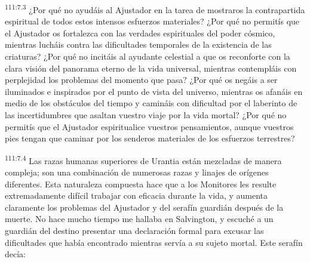\par
\textsuperscript{111:7.3} ¿Por qué no ayudáis al Ajustador en la tarea de mostraros la contrapartida espiritual de todos estos intensos esfuerzos materiales? ¿Por qué no permitís que el Ajustador os fortalezca con las verdades espirituales del poder cósmico, mientras lucháis contra las dificultades temporales de la existencia de las criaturas? ¿Por qué no incitáis al ayudante celestial a que os reconforte con la clara visión del panorama eterno de la vida universal, mientras contempláis con perplejidad los problemas del momento que pasa? ¿Por qué os negáis a ser iluminados e inspirados por el punto de vista del universo, mientras os afanáis en medio de los obstáculos del tiempo y camináis con dificultad por el laberinto de las incertidumbres que asaltan vuestro viaje por la vida mortal? ¿Por qué no permitís que el Ajustador espiritualice vuestros pensamientos, aunque vuestros pies tengan que caminar por los senderos materiales de los esfuerzos terrestres?

\par
\textsuperscript{111:7.4} Las razas humanas superiores de Urantia están mezcladas de manera compleja; son una combinación de numerosas razas y linajes de orígenes diferentes. Esta naturaleza compuesta hace que a los Monitores les resulte extremadamente difícil trabajar con eficacia durante la vida, y aumenta claramente los problemas del Ajustador y del serafín guardián después de la muerte. No hace mucho tiempo me hallaba en Salvington, y escuché a un guardián del destino presentar una declaración formal para excusar las dificultades que había encontrado mientras servía a su sujeto mortal. Este serafín decía:

